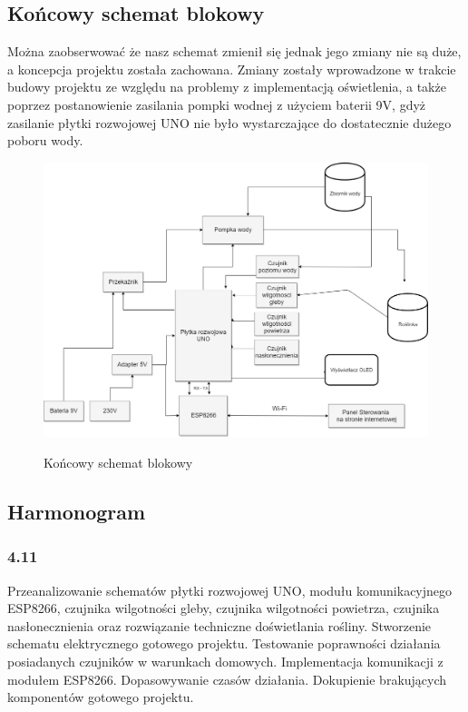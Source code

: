 \documentclass[12pt]{article}
\begin{document}
\newpage
\subsection{Końcowy schemat blokowy}
Można zaobserwować że nasz schemat zmienił się jednak jego zmiany nie są duże, a koncepcja projektu została zachowana. Zmiany zostały wprowadzone w trakcie budowy projektu ze względu na problemy z implementacją oświetlenia, a także poprzez postanowienie zasilania pompki wodnej z użyciem baterii 9V, gdyż zasilanie płytki rozwojowej UNO nie było wystarczające do dostatecznie dużego poboru wody.
\begin{figure}[!h]
	\begin{center}
		{\includegraphics[width=16cm]{schemat_blokowy_koncowy.png}}
	\end{center}
	\caption{Końcowy schemat blokowy}
\end{figure}


\newpage
\subsection{Harmonogram}
\subsubsection{4.11}
Przeanalizowanie schematów płytki rozwojowej UNO, modułu komunikacyjnego ESP8266, czujnika wilgotności gleby, czujnika wilgotności powietrza, czujnika nasłonecznienia oraz rozwiązanie techniczne doświetlania rośliny. Stworzenie schematu elektrycznego gotowego projektu. Testowanie poprawności działania posiadanych czujników w warunkach domowych. Implementacja komunikacji z modułem ESP8266. Dopasowywanie czasów działania. 
Dokupienie brakujących komponentów gotowego projektu. 
\end{document}
